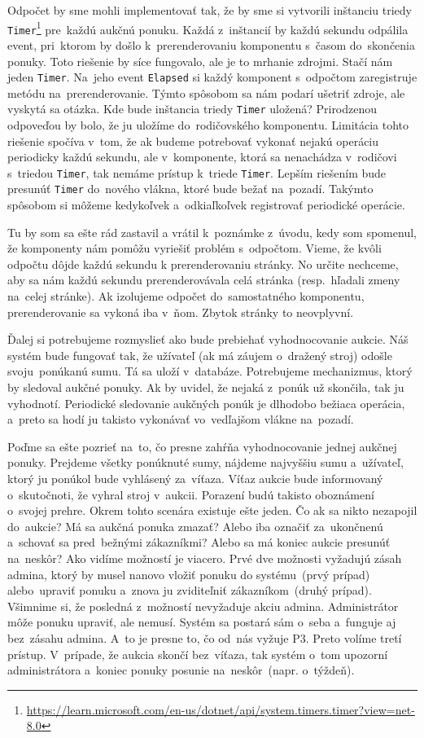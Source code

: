 Odpočet by sme mohli implementovať tak, že by sme si vytvorili inštanciu triedy \verb|Timer|\footnote{\url{https://learn.microsoft.com/en-us/dotnet/api/system.timers.timer?view=net-8.0}} pre~každú aukčnú ponuku. Každá z~inštancií by každú sekundu odpálila event, pri~ktorom by došlo k~prerenderovaniu komponentu s~časom do~skončenia ponuky. Toto riešenie by síce fungovalo, ale je to mrhanie zdrojmi. Stačí nám jeden \verb|Timer|. Na~jeho event \verb|Elapsed| si každý komponent s~odpočtom zaregistruje metódu na~prerenderovanie. Týmto spôsobom sa nám podarí ušetriť zdroje, ale vyskytá sa otázka. Kde bude inštancia triedy \verb|Timer| uložená? Prirodzenou odpoveďou by bolo, že ju uložíme do~rodičovského komponentu. Limitácia tohto riešenie spočíva v~tom, že ak budeme potrebovať vykonať nejakú operáciu periodicky každú sekundu, ale v~komponente, ktorá sa nenachádza v~rodičovi s~triedou \verb|Timer|, tak nemáme prístup k~triede \verb|Timer|. Lepším riešením bude presunúť \verb|Timer| do~nového vlákna, ktoré bude bežať na~pozadí. Takýmto spôsobom si môžeme kedykoľvek a~odkiaľkoľvek registrovať periodické operácie.

Tu by som sa ešte rád zastavil a vrátil k~poznámke z~úvodu, kedy som spomenul, že komponenty nám pomôžu vyriešiť problém s~odpočtom. Vieme, že kvôli odpočtu dôjde každú sekundu k prerenderovaniu stránky. No určite nechceme, aby sa nám každú sekundu prerenderovávala celá stránka (resp.~hľadali zmeny na~celej stránke). Ak izolujeme odpočet do~samostatného komponentu, prerenderovanie sa vykoná iba v~ňom. Zbytok stránky to neovplyvní.

Ďalej si potrebujeme rozmyslieť ako bude prebiehať vyhodnocovanie aukcie. Náš systém bude fungovať tak, že užívateľ (ak má záujem o~dražený stroj) odošle svoju~ponúkanú sumu. Tá sa uloží v~databáze. Potrebujeme mechanizmus, ktorý by sledoval aukčné ponuky. Ak by uvidel, že nejaká z~ponúk už skončila, tak ju vyhodnotí. Periodické sledovanie aukčných ponúk je dlhodobo bežiaca operácia, a~preto sa hodí ju takisto vykonávať vo~vedľajšom vlákne na~pozadí.

Poďme sa ešte pozrieť na~to, čo presne zahŕňa vyhodnocovanie jednej aukčnej ponuky. Prejdeme všetky ponúknuté sumy, nájdeme najvyššiu sumu a~užívateľ, ktorý ju ponúkol bude vyhlásený za~víťaza. Víťaz aukcie bude informovaný o~skutočnoti, že vyhral stroj v~aukcii. Porazení budú takisto oboznámení o~svojej prehre. Okrem tohto scenára existuje ešte jeden. Čo ak sa nikto nezapojil do~aukcie? Má sa aukčná ponuka zmazať? Alebo iba označiť za~ukončnenú a~schovať sa pred~bežnými zákazníkmi? Alebo sa má koniec aukcie presunúť na~neskôr? Ako vidíme možností je viacero. Prvé dve možnosti vyžadujú zásah admina, ktorý by musel nanovo vložiť ponuku do systému~(prvý prípad) alebo~upraviť ponuku a~znova ju zviditeľniť zákazníkom~(druhý prípad). Všimnime si, že posledná z~možností nevyžaduje akciu admina. Administrátor môže ponuku upraviť, ale nemusí. Systém sa postará sám o~seba a~funguje aj bez~zásahu admina. A~to je presne to, čo od~nás vyžuje P3. Preto volíme tretí prístup. V~prípade, že aukcia skončí bez~víťaza, tak systém o~tom upozorní administrátora a~koniec ponuky posunie na~neskôr~(napr. o~týždeň).

